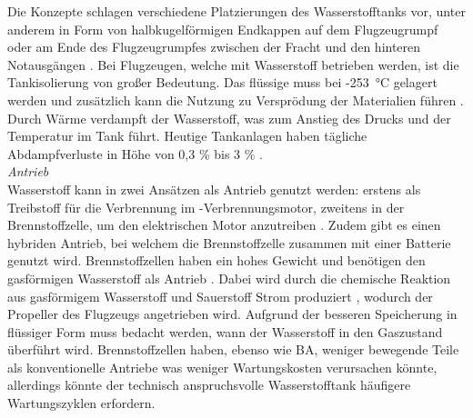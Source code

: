 Die Konzepte schlagen verschiedene Platzierungen des Wasserstofftanks vor, unter anderem in Form von halbkugelförmigen Endkappen auf dem Flugzeugrumpf \cite{dahal2021techno} 
oder am Ende des Flugzeugrumpfes zwischen der Fracht und den hinteren Notausgängen \cite{rietdijk2024architecture}.
Bei Flugzeugen, welche mit Wasserstoff betrieben werden, ist die Tankisolierung von großer Bedeutung. 
Das flüssige  muss bei -253 °C gelagert werden \cite{colpan2022fuel} 
und zusätzlich kann die Nutzung zu Versprödung der Materialien führen \cite{dahal2021techno}.
Durch Wärme verdampft der Wasserstoff, was zum Anstieg des Drucks und der Temperatur im Tank führt. Heutige Tankanlagen 
haben tägliche Abdampfverluste in Höhe von 0,3 \% bis 3 \% \cite{eichlseder2012hydrogen}.\\

%
%
%
\textit{Antrieb}\\
Wasserstoff kann in zwei Ansätzen als Antrieb genutzt werden: 
erstens als Treibstoff für die Verbrennung im -Verbrennungsmotor,
zweitens in der Brennstoffzelle, um den elektrischen Motor anzutreiben \cite{sky2020hydrogen}. 
Zudem gibt es einen hybriden Antrieb, bei welchem die Brennstoffzelle zusammen mit einer Batterie genutzt wird.
%
Brennstoffzellen haben ein hohes Gewicht \cite{hepperle2012electric} und 
benötigen den gasförmigen Wasserstoff als Antrieb \cite{colpan2022fuel}.
Dabei wird durch die chemische Reaktion aus gasförmigem Wasserstoff  und Sauerstoff  Strom produziert \cite{dalmia2022powering}, 
wodurch der Propeller des Flugzeugs angetrieben wird. Aufgrund der besseren Speicherung in flüssiger Form muss bedacht werden, wann der Wasserstoff in den Gaszustand überführt wird. 
Brennstoffzellen haben, ebenso wie BA, weniger bewegende Teile als konventionelle Antriebe \cite{dalmia2022powering} was weniger Wartungskosten verursachen könnte,
allerdings könnte der technisch anspruchsvolle Wasserstofftank häufigere Wartungszyklen erfordern.
%
